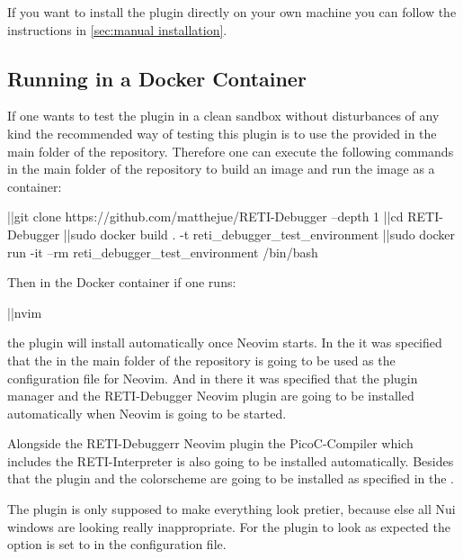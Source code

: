 \documentclass{report}
\begin{document}
If you want to install the plugin directly on your own machine you can follow the instructions in \ref{sec:manual installation}.

\subsection{Running in a Docker Container}
\label{sec:running in a docker image}

If one wants to test the plugin in a clean sandbox without disturbances of any kind the recommended way of testing this plugin is to use the provided  in the main folder of the repository. Therefore one can execute the following commands in the main folder of the repository to build an \alert{image} and run the image as a \alert{container}:

\begin{terminal}
	|\prompt|git clone https://github.com/matthejue/RETI-Debugger --depth 1
	|\prompt|cd RETI-Debugger
	|\prompt|sudo docker build . -t reti_debugger_test_environment
	|\prompt|sudo docker run -it --rm reti_debugger_test_environment /bin/bash
\end{terminal}

Then in the Docker container if one runs:

\begin{terminal}
	|\prompt|nvim
\end{terminal}

the plugin will install automatically once Neovim starts. In the  it was specified that the  in the main folder of the repository is going to be used as the configuration file  for Neovim. And in there it was specified that the \alert{plugin manager}  and the RETI-Debugger Neovim plugin are going to be installed automatically when Neovim is going to be started.

Alongside the RETI-Debuggerr Neovim plugin the PicoC-Compiler which includes the \alert{RETI-Interpreter} is also going to be installed automatically. Besides that the  plugin and the colorscheme  are going to be installed as specified in the .

The  plugin is only supposed to make everything look pretier, because else all \alert{Nui} windows are looking really inappropriate. For the  plugin to look as expected the option  is set to  in the configuration file.
\end{document}
